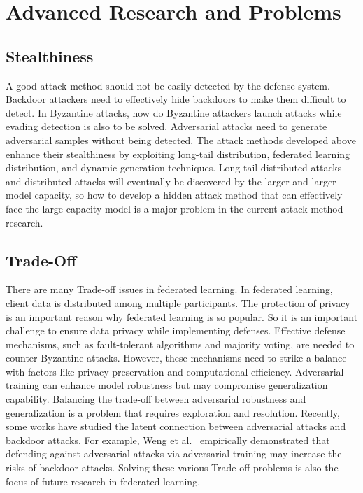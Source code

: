 \documentclass[pdflatex,sn-mathphys-num]{sn-jnl}%
\theoremstyle{thmstyleone}%
\theoremstyle{thmstyletwo}%
\theoremstyle{thmstylethree}%
\begin{document}
    \section{Advanced Research and Problems}
    \label{Advanced Research and Problems}
    \subsection{Stealthiness}
    
    A good attack method should not be easily detected by
    the defense system. Backdoor attackers need to effectively
    hide backdoors to make them diﬀicult to detect. In
    Byzantine attacks, how do Byzantine attackers launch
    attacks while evading detection is also to be solved.
    Adversarial attacks need to generate adversarial samples
    without being detected. The attack methods developed
    above enhance their stealthiness by exploiting long-tail
    distribution, federated learning distribution, and dynamic
    generation techniques. Long tail distributed attacks and
    distributed attacks will eventually be discovered by the
    larger and larger model capacity, so how to develop a
    hidden attack method that can effectively face the large
    capacity model is a major problem in the current attack
    method research.   
    
    \subsection{Trade-Off}
    There are many Trade-off issues in federated learning.
    In federated learning, client data is distributed among
    multiple participants. The protection of privacy is an
    important reason why federated learning is so popular.
    So it is an important challenge to ensure data privacy
    while implementing defenses. Effective defense
    mechanisms, such as fault-tolerant algorithms and majority
    voting, are needed to counter Byzantine attacks. However,
    these mechanisms need to strike a balance with factors
    like privacy preservation and computational eﬀiciency.
    Adversarial training can enhance model robustness but
    may compromise generalization capability. Balancing the
    trade-off between adversarial robustness and
    generalization is a problem that requires exploration and resolution.
    Recently, some works have studied the latent connection
    between adversarial attacks and backdoor attacks. For
    example, Weng et al.~\cite{weng2020trade} empirically demonstrated that
    defending against adversarial attacks via adversarial
    training may increase the risks of backdoor attacks. Solving
    these various Trade-off problems is also the focus of future
    research in federated learning.
    
\end{document}
